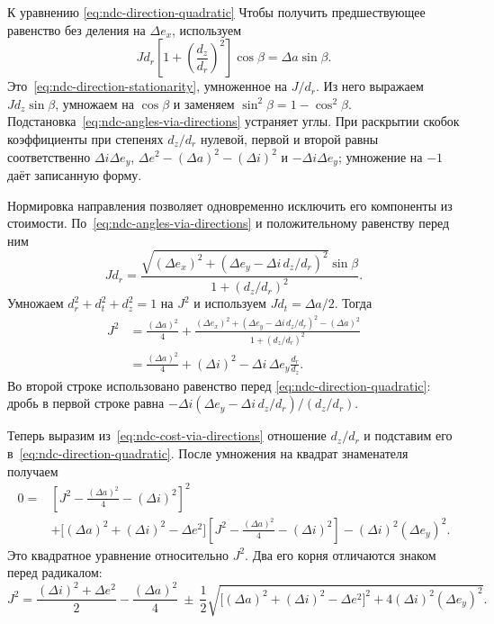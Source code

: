 \begin{explanation}{К уравнению \eqref{eq:ndc-direction-quadratic}}
Чтобы получить предшествующее равенство без деления на
$\Delta e_x$, используем
\[
 Jd_r\left[1+\left(\frac{d_z}{d_r}\right)^2\right]\cos\beta
       =\Delta a\sin\beta.
\]
Это~\eqref{eq:ndc-direction-stationarity}, умноженное на $J/d_r$.
Из него выражаем $Jd_z\sin\beta$, умножаем на
$\cos\beta$ и заменяем $\sin^2\beta=1-\cos^2\beta$.
Подстановка~\eqref{eq:ndc-angles-via-directions} устраняет углы.
При раскрытии скобок коэффициенты при степенях $d_z/d_r$
нулевой, первой и второй равны соответственно $\Delta i\Delta e_y$,
$\Delta e^2-(\Delta a)^2-(\Delta i)^2$ и
$-\Delta i\Delta e_y$; умножение на $-1$ даёт записанную форму.
\end{explanation}

Нормировка направления позволяет одновременно исключить
его компоненты из стоимости. По~\eqref{eq:ndc-angles-via-directions}
и положительному равенству перед ним
\[
 Jd_r=\frac{
 \sqrt{(\Delta e_x)^2+(\Delta e_y-\Delta i\,d_z/d_r)^2}\sin\beta}
 {1+(d_z/d_r)^2}.
\]
Умножаем $d_r^2+d_t^2+d_z^2=1$ на $J^2$ и используем
$Jd_t=\Delta a/2$. Тогда
\begin{equation}
\begin{aligned}
 J^2&=\frac{(\Delta a)^2}{4}
 +\frac{(\Delta e_x)^2+(\Delta e_y-\Delta i\,d_z/d_r)^2-(\Delta a)^2}
        {1+(d_z/d_r)^2}\\
 &=\frac{(\Delta a)^2}{4}+(\Delta i)^2
                         -\Delta i\,\Delta e_y\frac{d_r}{d_z}.
\end{aligned}
\label{eq:ndc-cost-via-directions}
\end{equation}
Во второй строке использовано равенство перед
\eqref{eq:ndc-direction-quadratic}: дробь в первой строке
равна $-\Delta i(\Delta e_y-\Delta i\,d_z/d_r)/(d_z/d_r)$.

Теперь выразим из~\eqref{eq:ndc-cost-via-directions} отношение
$d_z/d_r$ и подставим его в~\eqref{eq:ndc-direction-quadratic}.
После умножения на квадрат знаменателя получаем
\begin{equation}
\begin{aligned}
 0={}&\left[J^2-\frac{(\Delta a)^2}{4}-(\Delta i)^2\right]^2\\
 &+\bigl[(\Delta a)^2+(\Delta i)^2-\Delta e^2\bigr]
        \left[J^2-\frac{(\Delta a)^2}{4}-(\Delta i)^2\right]
        -(\Delta i)^2(\Delta e_y)^2.
\end{aligned}
\label{eq:ndc-cost-quadratic}
\end{equation}
Это квадратное уравнение относительно $J^2$.
Два его корня отличаются знаком перед радикалом:
\[
 J^2=\frac{(\Delta i)^2+\Delta e^2}{2}-\frac{(\Delta a)^2}{4}
 \ \pm\ \frac12\sqrt{
   \bigl[(\Delta a)^2+(\Delta i)^2-\Delta e^2\bigr]^2
                  +4(\Delta i)^2(\Delta e_y)^2}.
\]

